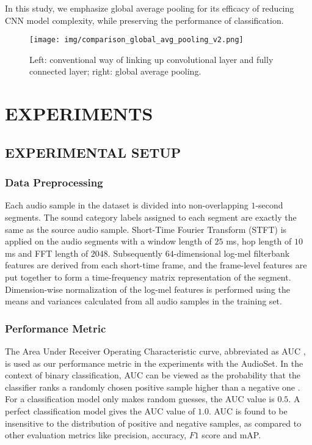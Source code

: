 \documentclass{article}
\begin{document}
In this study, we emphasize global average pooling for its efficacy of reducing CNN model complexity, while preserving the performance of classification.

\begin{figure}[h]
  \centering
  \texttt{[image: img/comparison\_global\_avg\_pooling\_v2.png]}
  \caption{Left: conventional way of linking up convolutional layer and fully connected layer; right: global average pooling.}
  \label{global_avg_pool}
\end{figure}

\section{EXPERIMENTS}
\label{sec:experiments}

\subsection{EXPERIMENTAL SETUP}
\label{ssec:experimentsetup}

\subsubsection{Data Preprocessing}
\label{sssec:preprocessdata}

Each audio sample in the dataset is divided into non-overlapping $1$-second segments. The sound category labels assigned to each segment are exactly the same as the source audio sample. Short-Time Fourier Transform (STFT) is applied on the audio segments with a window length of $25$ ms, hop length of $10$ ms and FFT length of $2048$. Subsequently $64$-dimensional log-mel filterbank features are derived from each short-time frame, and the frame-level features are put together to form a time-frequency matrix representation of the segment. Dimension-wise normalization of the log-mel features is performed using the means and variances calculated from all audio samples in the training set.

\subsubsection{Performance Metric}
\label{sssec:evaluationmetric}

The Area Under Receiver Operating Characteristic curve, abbreviated as AUC \cite{rocaucdef}, is used as our performance metric in the experiments with the AudioSet. In the context of binary classification, AUC can be viewed as the probability that the classifier ranks a randomly chosen positive sample higher than a negative one \cite{aucproperty}. For a classification model only makes random guesses, the AUC value is $0.5$. A perfect classification model gives the AUC value of $1.0$. AUC is found to be insensitive to the distribution of positive and negative samples, as compared to other evaluation metrics like precision, accuracy, $F1$ score and mAP.
\end{document}
